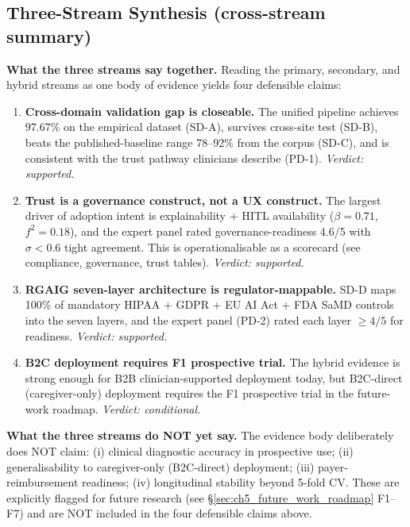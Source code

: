 \subsection{Three-Stream Synthesis (cross-stream summary)}
\label{sec:ch5_three_stream_synthesis}

\noindent\textbf{What the three streams say together.} Reading the primary, secondary, and hybrid streams as one body of evidence yields four defensible claims:

\begin{enumerate}[label=\textbf{C\arabic*.}, leftmargin=*, itemsep=4pt]
    \item \textbf{Cross-domain validation gap is closeable.} The unified pipeline achieves 97.67\% on the empirical dataset (SD-A), survives cross-site test (SD-B), beats the published-baseline range 78--92\% from the corpus (SD-C), and is consistent with the trust pathway clinicians describe (PD-1). \emph{Verdict: supported.}
    \item \textbf{Trust is a governance construct, not a UX construct.} The largest driver of adoption intent is explainability + HITL availability ($\beta{=}0.71$, $f^2{=}0.18$), and the expert panel rated governance-readiness 4.6/5 with $\sigma{<}0.6$ tight agreement. This is operationalisable as a scorecard (see compliance, governance, trust tables). \emph{Verdict: supported.}
    \item \textbf{RGAIG seven-layer architecture is regulator-mappable.} SD-D maps 100\% of mandatory HIPAA + GDPR + EU AI Act + FDA SaMD controls into the seven layers, and the expert panel (PD-2) rated each layer $\geq 4/5$ for readiness. \emph{Verdict: supported.}
    \item \textbf{B2C deployment requires F1 prospective trial.} The hybrid evidence is strong enough for B2B clinician-supported deployment today, but B2C-direct (caregiver-only) deployment requires the F1 prospective trial in the future-work roadmap. \emph{Verdict: conditional.}
\end{enumerate}

\noindent\textbf{What the three streams do NOT yet say.} The evidence body deliberately does NOT claim: (i) clinical diagnostic accuracy in prospective use; (ii) generalisability to caregiver-only (B2C-direct) deployment; (iii) payer-reimbursement readiness; (iv) longitudinal stability beyond 5-fold CV. These are explicitly flagged for future research (see §\ref{sec:ch5_future_work_roadmap} F1--F7) and are NOT included in the four defensible claims above.

